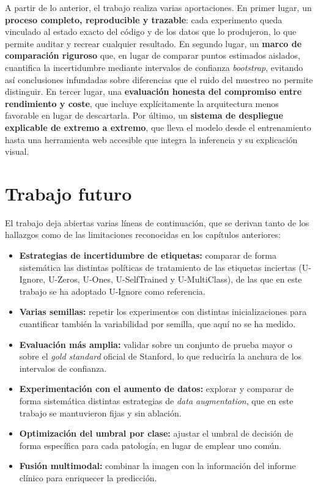 A partir de lo anterior, el trabajo realiza varias aportaciones. En primer lugar, un
\textbf{proceso completo, reproducible y trazable}: cada experimento queda vinculado al
estado exacto del código y de los datos que lo produjeron, lo que permite auditar y
recrear cualquier resultado. En segundo lugar, un \textbf{marco de comparación riguroso}
que, en lugar de comparar puntos estimados aislados, cuantifica la incertidumbre
mediante intervalos de confianza \textit{bootstrap}, evitando así conclusiones
infundadas sobre diferencias que el ruido del muestreo no permite distinguir. En tercer
lugar, una \textbf{evaluación honesta del compromiso entre rendimiento y coste}, que
incluye explícitamente la arquitectura menos favorable en lugar de descartarla. Por
último, un \textbf{sistema de despliegue explicable de extremo a extremo}, que lleva el
modelo desde el entrenamiento hasta una herramienta web accesible que integra la
inferencia y su explicación visual.

\section{Trabajo futuro}
\label{sec::concl_futuro}

El trabajo deja abiertas varias líneas de continuación, que se derivan tanto de los
hallazgos como de las limitaciones reconocidas en los capítulos anteriores:

\begin{itemize}
  \item \textbf{Estrategias de incertidumbre de etiquetas:} comparar de forma
        sistemática las distintas políticas de tratamiento de las etiquetas inciertas
        (U-Ignore, U-Zeros, U-Ones, U-SelfTrained y U-MultiClass), de las que en este
        trabajo se ha adoptado U-Ignore como referencia.
  \item \textbf{Varias semillas:} repetir los experimentos con distintas
        inicializaciones para cuantificar también la variabilidad por semilla, que aquí
        no se ha medido.
  \item \textbf{Evaluación más amplia:} validar sobre un conjunto de prueba mayor o
        sobre el \textit{gold standard} oficial de Stanford, lo que reduciría la anchura
        de los intervalos de confianza.
  \item \textbf{Experimentación con el aumento de datos:} explorar y comparar de forma
        sistemática distintas estrategias de \textit{data augmentation}, que en este
        trabajo se mantuvieron fijas y sin ablación.
  \item \textbf{Optimización del umbral por clase:} ajustar el umbral de decisión de
        forma específica para cada patología, en lugar de emplear uno común.
  \item \textbf{Fusión multimodal:} combinar la imagen con la información del informe
        clínico para enriquecer la predicción.
\end{itemize}
